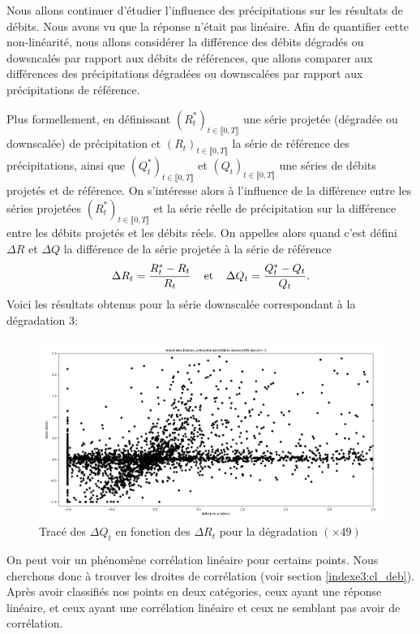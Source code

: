 \documentclass[a4paper,11pt]{article}
\numberwithin{equation}{section}
\begin{document}
Nous allons continuer d'étudier l'influence des précipitations sur les résultats de débits. Nous avons vu que la réponse n'était pas linéaire.
Afin de quantifier cette non-linéarité, nous allons considérer la différence des débits dégradés ou dowsncalés par rapport aux débits de références, que allons comparer aux différences des précipitations dégradées ou downscalées par rapport aux précipitations de référence. 

Plus formellement, en définissant $(R^{*}_t)_{t \in \llbracket 0, T\rrbracket}$ une série projetée (dégradée ou downscalée) de précipitation et $(R_t)_{t \in \llbracket 0, T\rrbracket}$ la série de référence des précipitations, ainsi que $(Q^{*}_t)_{t \in \llbracket 0, T\rrbracket}$ et $(Q_t)_{t \in \llbracket 0, T\rrbracket}$ une séries de débits projetés et de référence. On s'intéresse alors à l'influence de la différence entre les séries projetées $(R^{*}_t)_{t \in \llbracket 0, T\rrbracket}$ et la série réelle de précipitation sur la différence entre les débits projetés et les débits réels. On appelles alors quand c'est défini $\Delta R$ et $\Delta Q$ la différence de la série projetée à la série de référence 
\[\Delta R_t=\frac{R^{*}_t-R_t}{R_t}\hspace{4mm} \textrm{et} \hspace{4mm} \Delta Q_t =\frac{Q^{*}_t-Q_t}{Q_t}.\]
Voici les résultats obtenus pour la série downscalée correspondant à la dégradation $3$:
\begin{figure}[H]
	\label{fig-deb_prec_3}
	\begin{center}
		\includegraphics[scale=0.25]{deb_prec_dec1.png}
	\end{center}
	\caption{Tracé des $\Delta Q_t$ en fonction des $\Delta R_{t}$ pour la dégradation $(\times49)$}
\end{figure}

On peut voir un phénomène corrélation linéaire pour certains points. Nous cherchons donc à trouver les droites de corrélation (voir section \ref{indexe3:cl_deb}). Après avoir classifiés nos points en deux catégories, ceux ayant une réponse linéaire, et ceux ayant une corrélation linéaire et ceux ne semblant pas avoir de corrélation.
\end{document}
